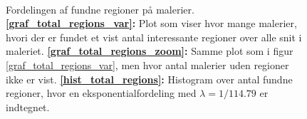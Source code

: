 {\begin{figure}[!h]
    \centering
    \\
    \caption[]{Fordelingen af fundne regioner på malerier.
    \textbf{\ref{graf_total_regions_var}:} Plot som viser hvor mange
    malerier, hvori der er fundet et vist antal interessante regioner
    over alle snit i maleriet.
    \textbf{\ref{graf_total_regions_zoom}:} Samme plot som i figur
    \ref{graf_total_regions_var}, men hvor antal malerier uden regioner
    ikke er vist.
    \textbf{\ref{hist_total_regions}:} Histogram over antal fundne
    regioner, hvor en eksponentialfordeling med $\lambda = 1/114.79$ er
    indtegnet.}
    \label{total_regions_plots}
\end{figure}

}
